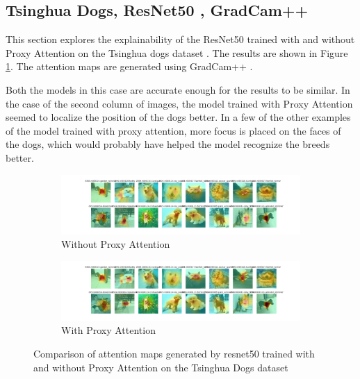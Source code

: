 \documentclass[a4paper,11pt,openright]{book}
\begin{document}
\subsection{Tsinghua Dogs, ResNet50 , GradCam++}
This section explores the explainability of the ResNet50 \cite{heDeepResidualLearning2016} trained with and without Proxy Attention on the Tsinghua dogs dataset \cite{zouNewDatasetDog2020}. The results are shown in Figure \ref{fig:resnet50_tsing}. The attention maps are generated using GradCam++ \cite{chattopadhayGradCAMGeneralizedGradientBased2018}.

Both the models in this case are accurate enough for the results to be similar. In the case of the second column of images, the model trained with Proxy Attention seemed to localize the position of the dogs better.  In a few of the other examples of the model trained with proxy attention, more focus is placed on the faces of the dogs, which would probably have helped the model recognize the breeds better.

\begin{figure}[!htb]
    \begin{subfigure}[b]{1\textwidth}
        \includegraphics[width=\linewidth]{images/gpp_tsing_resnet50_noproxy_0.pdf}
        \caption{Without Proxy Attention}
    \end{subfigure}
    \begin{subfigure}[b]{1\textwidth}
        \includegraphics[width=\linewidth]{images/gpp_tsing_resnet50_proxy_0.pdf}
        \caption{With Proxy Attention}
    \end{subfigure}
    \caption{Comparison of attention maps generated by resnet50 trained with and without Proxy Attention on the Tsinghua Dogs dataset}
    \label{fig:resnet50_tsing}
\end{figure}
\end{document}
